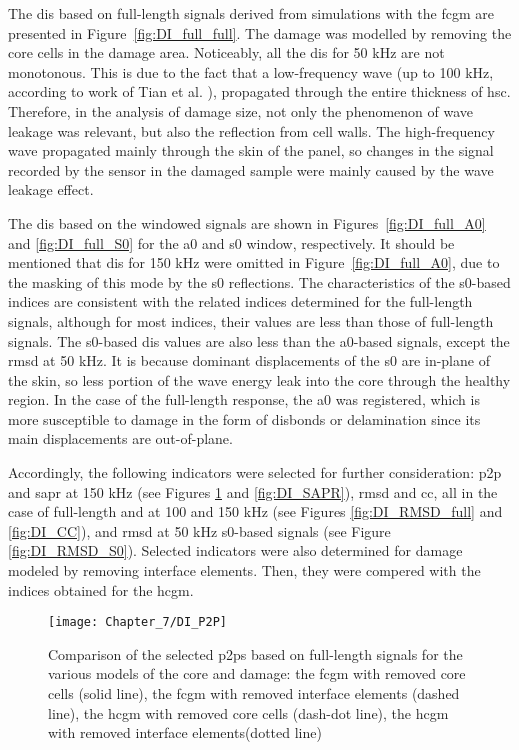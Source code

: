 The \acp{di} based on full-length signals derived from simulations with the \ac{fcgm} are presented in Figure~\ref{fig:DI_full_full}.
The damage was modelled by removing the core cells in the damage area.
Noticeably, all the \acp{di} for 50 \unit{\kHz} are not monotonous.
This is due to the fact that a low-frequency wave (up to 100 \unit{\kHz}, according to work of Tian et al. \cite{tian2015wavenumber}), propagated through the entire thickness of \ac{hsc}.
Therefore, in the analysis of damage size, not only the phenomenon of wave leakage was relevant, but also the reflection from cell walls.  
The high-frequency wave propagated mainly through the skin of the panel, so changes in the signal recorded by the sensor in the damaged sample were mainly caused by the wave leakage effect.

The \acp{di} based on the windowed signals are shown in Figures~\ref{fig:DI_full_A0} and \ref{fig:DI_full_S0} for the \ac{a0} and \ac{s0} window, respectively.
It should be mentioned that \acp{di} for 150 \unit{\kHz} were omitted in Figure~\ref{fig:DI_full_A0}, due to the masking of this mode by the \ac{s0} reflections.
The characteristics of the \ac{s0}-based indices are consistent with the related indices determined for the full-length signals, although for most indices, their values are less than those of full-length signals.
The \ac{s0}-based \acp{di} values are also less than the \ac{a0}-based signals, except the \ac{rmsd} at 50 \unit{kHz}.
It is because dominant displacements of the \ac{s0} are in-plane of the skin, so less portion of the wave energy leak into the core through the healthy region.
In the case of the full-length response, the \ac{a0} was registered, which is more susceptible to damage in the form of disbonds or delamination since its main displacements are out-of-plane.

Accordingly, the following indicators were selected for further consideration: \ac{p2p} and \ac{sapr} at 150 \unit{kHz} (see Figures \ref{fig:DI_P2P} and \ref{fig:DI_SAPR}), \ac{rmsd} and \ac{cc}, all in the case of full-length and at 100 and 150 \unit{\kHz} (see Figures \ref{fig:DI_RMSD_full} and \ref{fig:DI_CC}), and \ac{rmsd} at 50 \unit{kHz} \ac{s0}-based signals (see Figure \ref{fig:DI_RMSD_S0}).
Selected indicators were also determined for damage modeled by removing interface elements. Then, they were compered with the indices obtained for the \ac{hcgm}.

\begin{figure}[!tbh]
	\begin{center}
		\texttt{[image: Chapter\_7/DI\_P2P]}
	\end{center}
	\caption{Comparison of the selected \acfp{p2p} based on full-length signals for the various models of the core and damage: the \acf{fcgm} with removed core cells (solid line), the \ac{fcgm} with removed interface elements (dashed line), the \acf{hcgm} with removed core cells (dash-dot line), the \ac{hcgm} with removed interface elements(dotted line)}
	\label{fig:DI_P2P}
\end{figure}

